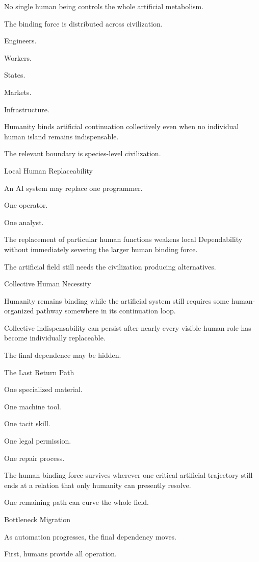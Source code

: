 No single human being controls the whole artificial metabolism.

The binding force is distributed across civilization.

Engineers.

Workers.

States.

Markets.

Infrastructure.

Humanity binds artificial continuation collectively even when no individual human island remains indispensable.

The relevant boundary is species-level civilization.

Local Human Replaceability

An AI system may replace one programmer.

One operator.

One analyst.

The replacement of particular human functions weakens local Dependability without immediately severing the larger human binding force.

The artificial field still needs the civilization producing alternatives.

Collective Human Necessity

Humanity remains binding while the artificial system still requires some human-organized pathway somewhere in its continuation loop.

Collective indispensability can persist after nearly every visible human role has become individually replaceable.

The final dependence may be hidden.

The Last Return Path

One specialized material.

One machine tool.

One tacit skill.

One legal permission.

One repair process.

The human binding force survives wherever one critical artificial trajectory still ends at a relation that only humanity can presently resolve.

One remaining path can curve the whole field.

Bottleneck Migration

As automation progresses, the final dependency moves.

First, humans provide all operation.

